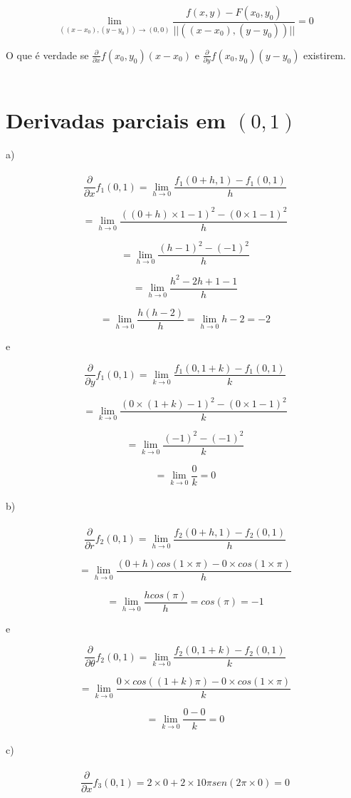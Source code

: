 \documentclass[11pt]{article}
\begin{document}
$$\lim_{((x-x_0), (y-y_0)) \rightarrow (0, 0)} \frac{f(x, y) - F(x_0, y_0)}{||((x-x_0), (y-y_0))||} = 0$$

O que é verdade se $\frac{\partial}{\partial x} f(x_0, y_0)(x-x_0)$ e $\frac{\partial}{\partial y} f(x_0, y_0) (y-y_0)$ existirem.\\
\\
\section{Derivadas parciais em $(0, 1)$}

a)\\
\\
$$\frac{\partial}{\partial x} f_1(0, 1) = \lim_{h \rightarrow 0} \frac{f_1(0+h, 1) - f_1(0, 1)}{h}$$

$$ = \lim_{h \rightarrow 0} \frac{((0+h)\times 1 - 1)^2 - (0 \times 1 - 1)^2}{h}$$

$$ = \lim_{h \rightarrow 0} \frac{(h-1)^2 - (-1)^2}{h}$$

$$ = \lim_{h \rightarrow 0} \frac{h^2 - 2h +1 -1}{h}$$

$$ = \lim_{h \rightarrow 0} \frac{h(h - 2)}{h} = \lim_{h \rightarrow 0} h - 2 = -2$$

e

$$\frac{\partial}{\partial y} f_1(0, 1) = \lim_{k \rightarrow 0} \frac{f_1(0, 1+k) - f_1(0, 1)}{k}$$

$$ = \lim_{k \rightarrow 0} \frac{(0\times (1+k) - 1)^2 - (0 \times 1 - 1)^2}{k}$$

$$ = \lim_{k \rightarrow 0} \frac{(-1)^2 - (-1)^2}{k}$$

$$ = \lim_{k \rightarrow 0} \frac{0}{k} = 0$$
\\
b)\\
\\
$$ \frac{\partial}{\partial r} f_2(0, 1)= \lim_{h \rightarrow 0} \frac{f_2(0+h, 1) - f_2(0, 1)}{h}$$

$$ = \lim_{h \rightarrow 0} \frac{(0+h)cos(1 \times \pi) - 0 \times cos(1 \times \pi)}{h}$$

$$ = \lim_{h \rightarrow 0} \frac{hcos(\pi)}{h} = cos(\pi) = -1$$

e

$$\frac{\partial}{\partial \theta} f_2(0, 1) = \lim_{k \rightarrow 0} \frac{f_2(0, 1+k) - f_2(0, 1)}{k}$$

$$ = \lim_{k \rightarrow 0} \frac{0 \times cos((1+k)\pi) - 0 \times cos(1 \times \pi)}{k}$$

$$ = \lim_{k \rightarrow 0} \frac{0-0}{k} = 0$$
\\
c)\\
\\
$$\frac{\partial}{\partial x} f_3(0, 1) = 2 \times 0 + 2\times10\pi sen(2 \pi \times 0) = 0$$
\end{document}
